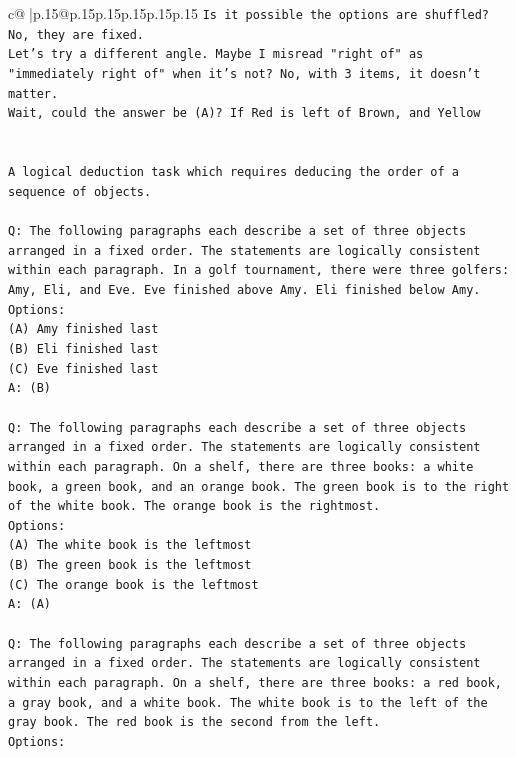 \documentclass{article}
\begin{document}
{\begin{supertabular}{c@{$\;$}|p{.15\linewidth}@{}p{.15\linewidth}p{.15\linewidth}p{.15\linewidth}p{.15\linewidth}p{.15\linewidth}}
{{{\texttt{Is it possible the options are shuffled? No, they are fixed.} \\
\texttt{Let's try a different angle. Maybe I misread "right of" as "immediately right of" when it's not? No, with 3 items, it doesn't matter.} \\
\texttt{Wait, could the answer be (A)? If Red is left of Brown, and Yellow} \\
\\ 
\\ 
\texttt{A logical deduction task which requires deducing the order of a sequence of objects.} \\
\\ 
\texttt{Q: The following paragraphs each describe a set of three objects arranged in a fixed order. The statements are logically consistent within each paragraph. In a golf tournament, there were three golfers: Amy, Eli, and Eve. Eve finished above Amy. Eli finished below Amy.} \\
\texttt{Options:} \\
\texttt{(A) Amy finished last} \\
\texttt{(B) Eli finished last} \\
\texttt{(C) Eve finished last} \\
\texttt{A: (B)} \\
\\ 
\texttt{Q: The following paragraphs each describe a set of three objects arranged in a fixed order. The statements are logically consistent within each paragraph. On a shelf, there are three books: a white book, a green book, and an orange book. The green book is to the right of the white book. The orange book is the rightmost.} \\
\texttt{Options:} \\
\texttt{(A) The white book is the leftmost} \\
\texttt{(B) The green book is the leftmost} \\
\texttt{(C) The orange book is the leftmost} \\
\texttt{A: (A)} \\
\\ 
\texttt{Q: The following paragraphs each describe a set of three objects arranged in a fixed order. The statements are logically consistent within each paragraph. On a shelf, there are three books: a red book, a gray book, and a white book. The white book is to the left of the gray book. The red book is the second from the left.} \\
\texttt{Options:} \\
}}}
\end{supertabular}}
\end{document}
